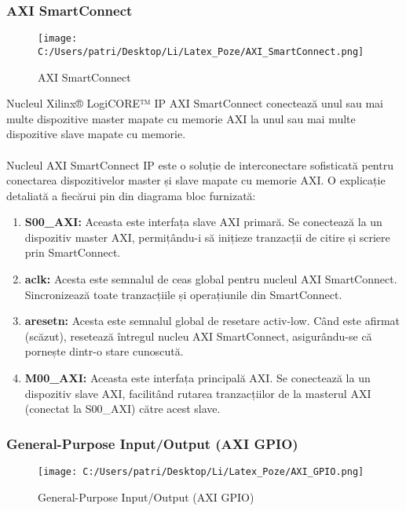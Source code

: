 \documentclass[12pt]{article}
\begin{document}
\subsubsection{AXI SmartConnect}

\begin{figure}[H]
    \centering
    \texttt{[image: C:/Users/patri/Desktop/Li/Latex\_Poze/AXI\_SmartConnect.png]}
    \caption{AXI SmartConnect}
\end{figure}

\hspace*{1cm}Nucleul Xilinx® LogiCORE™ IP AXI SmartConnect conectează unul sau mai multe dispozitive master mapate cu memorie AXI la unul sau mai multe dispozitive slave mapate cu memorie.\\\\
\hspace*{1cm}Nucleul AXI SmartConnect IP este o soluție de interconectare sofisticată pentru conectarea dispozitivelor master și slave mapate cu memorie AXI. O explicație detaliată a fiecărui pin din diagrama bloc furnizată:
\begin{enumerate}
    \item \textbf{S00\_AXI:} Aceasta este interfața slave AXI primară. Se conectează la un dispozitiv master AXI, permițându-i să inițieze tranzacții de citire și scriere prin SmartConnect.
    \item \textbf{aclk:} Acesta este semnalul de ceas global pentru nucleul AXI SmartConnect. Sincronizează toate tranzacțiile și operațiunile din SmartConnect.
    \item \textbf{aresetn:} Acesta este semnalul global de resetare activ-low. Când este afirmat (scăzut), resetează întregul nucleu AXI SmartConnect, asigurându-se că pornește dintr-o stare cunoscută.
    \item \textbf{M00\_AXI:} Aceasta este interfața principală AXI. Se conectează la un dispozitiv slave AXI, facilitând rutarea tranzacțiilor de la masterul AXI (conectat la S00\_AXI) către acest slave.
\end{enumerate}

\subsubsection{General-Purpose Input/Output (AXI GPIO)} 

\begin{figure}[H]
    \centering
    \texttt{[image: C:/Users/patri/Desktop/Li/Latex\_Poze/AXI\_GPIO.png]}
    \caption{General-Purpose Input/Output (AXI GPIO)}
\end{figure}
\end{document}
